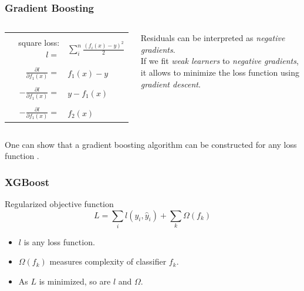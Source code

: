\begin{frame}
	\frametitle{Gradient Boosting}
	
	\begin{columns}
	
	\begin{tabular}{r l}
	\\\\
	square loss: $l =$ & $\sum\limits_{i}^{n} \frac{(f_i(x)-y)^2}{2}$
	\\\\
	$\frac{\partial l}{\partial f_1(x)}  = $ & $f_1(x)-y$\\\\
	$- \frac{\partial l}{\partial f_1(x)}  = $ & $y - f_1(x)$\\\\
	$- \frac{\partial l}{\partial f_1(x)}  = $ & $f_2(x)$
	\end{tabular}
	
	\begin{block}{}
	Residuals can be interpreted as \emph{negative gradients}.\\ \vspace{4ex}
	If we fit \emph{weak learners} to \emph{negative gradients}, it allows to minimize the loss function using \emph{gradient descent}.
	\end{block}
	\end{columns}
	
	\vspace{4ex}
	One can show that a gradient boosting algorithm can be constructed for any loss function \cite{gradboost}.
\end{frame}

\begin{frame}
	\frametitle{XGBoost}
	\begin{center}
	Regularized objective function
	$$L=\sum\limits_{i} l(y_i,\hat{y}_i)+\sum\limits_{k} \Omega (f_k)$$
	\end{center}
	\begin{itemize}
		\item $l$ is any loss function.
		\item $\Omega(f_k)$ measures complexity of classifier $f_k$.
		\item As $L$ is minimized, so are $l$ and $\Omega$.
	\end{itemize}
\end{frame}

